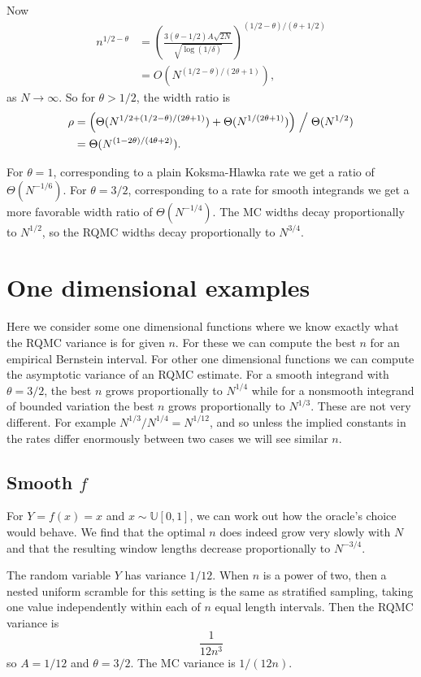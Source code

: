 \documentclass{article}
\newcommand{\runif}{\mathbb{U}}
\begin{document}
Now
\begin{align*}
n^{1/2-\theta} 
&= \left(\frac
{3(\theta-1/2)A
  \sqrt{2N}}{\sqrt{\log(1/\delta)}}\right)^{(1/2-\theta)/(\theta+1/2)}\\
&= O( N^{(1/2-\theta)/(2\theta+1)}),
\end{align*}
as $N\to\infty$. So for $\theta>1/2$, the width ratio is
\begin{align*}
\rho&=\Bigl(
\Theta(N^{1/2+(1/2-\theta)/(2\theta+1)})
+ \Theta( N^{1/(2\theta+1)})
\Bigr)\Bigm/
\Theta(N^{1/2})\\
&=\Theta( N^{(1-2\theta)/(4\theta+2)}).
\end{align*}

For $\theta=1$, corresponding to a plain Koksma-Hlawka rate
we get a ratio of $\Theta(N^{-1/6})$.
For $\theta=3/2$, corresponding to a rate for smooth integrands
we get a more favorable width ratio of $\Theta(N^{-1/4})$.
The MC widths decay proportionally to $N^{1/2}$, so the
RQMC widths decay proportionally to $N^{3/4}$.

\section{One dimensional examples}

Here we consider some one dimensional functions where we know exactly what the RQMC variance is for given $n$.  For these we can compute the best $n$ for an empirical Bernstein interval.  For other one dimensional functions we can compute the asymptotic variance of an RQMC estimate. For a smooth integrand with $\theta=3/2$, the best $n$ grows proportionally to $N^{1/4}$ while for a nonsmooth integrand of bounded variation the best $n$ grows proportionally to $N^{1/3}$.  These are not very different.  For example $N^{1/3}/N^{1/4}=N^{1/12}$, and  so unless the implied constants in the rates differ enormously between two cases we will see similar $n$.

\subsection{Smooth $f$}
For $Y=f(x)=x$ and $x\sim \runif[0,1]$, we can work out how the oracle's
choice would behave.  We find that the optimal $n$ does indeed grow
very slowly with $N$ and that the resulting window lengths
decrease proportionally to $N^{-3/4}$.


The random variable $Y$ has variance $1/12$.
When $n$ is a power of two, then a nested uniform scramble for this setting is
the same as stratified sampling, taking one value independently
within each of $n$ equal length intervals. Then the RQMC variance is
$$
\frac{1}{12n^3}
$$
so $A=1/12$ and $\theta=3/2$.  
The MC variance is $1/(12n)$.
\end{document}
